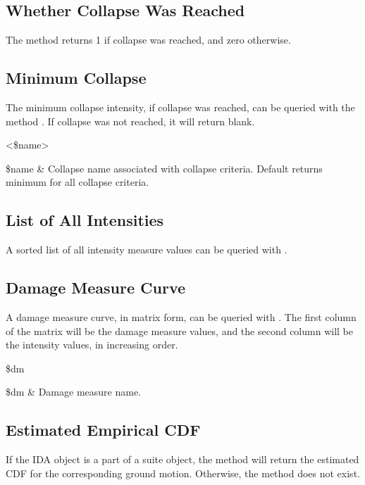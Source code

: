 \documentclass{article}
\renewcommand{\^}[1]{\textsuperscript{#1}}
\renewcommand{\_}[1]{\textsubscript{#1}}
\begin{document}
\subsection{Whether Collapse Was Reached}
The method  returns 1 if collapse was reached, and zero otherwise.
\begin{syntax}
\end{syntax}
\subsection{Minimum Collapse}
The minimum collapse intensity, if collapse was reached, can be queried with the method .
If collapse was not reached, it will return blank.
\begin{syntax}
 <\$name>
\end{syntax}
\begin{args}
\$name & Collapse name associated with collapse criteria. Default returns minimum for all collapse criteria.
\end{args}
\clearpage
\subsection{List of All Intensities}
A sorted list of all intensity measure values can be queried with .
\begin{syntax}
\end{syntax}
\subsection{Damage Measure Curve}
A damage measure curve, in matrix form, can be queried with .
The first column of the matrix will be the damage measure values, and the second column will be the intensity values, in increasing order.
\begin{syntax}
 \$dm
\end{syntax}
\begin{args}
\$dm & Damage measure name.
\end{args}
\subsection{Estimated Empirical CDF}
If the IDA object is a part of a suite object, the method  will return the estimated CDF for the corresponding ground motion. 
Otherwise, the method does not exist.
\begin{syntax}
\end{syntax}
\end{document}
